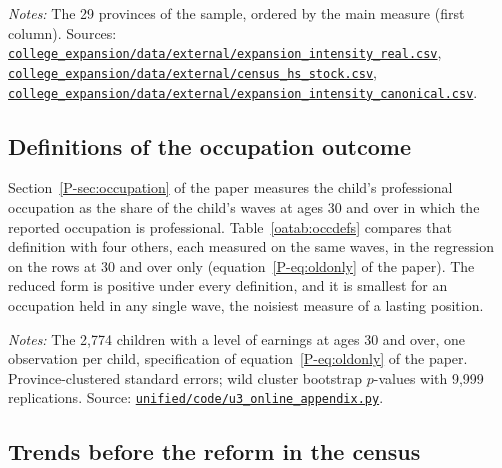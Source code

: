 \documentclass[11pt]{article}
\numberwithin{equation}{section}
\newcommand{\repourl}{https://github.com/JiachenJin1001/family-background-earnings-china}
\newcommand{\code}[1]{\href{\repourl/blob/main/#1}{\nolinkurl{#1}}}
\begin{document}
\begin{table}[H]
\centering
\footnotesize
\caption{Provincial intensity measures.}
\label{oatab:intensity}
\setlength{\tabcolsep}{3.4pt}

\par\smallskip
\begin{minipage}{0.96\textwidth}
\footnotesize\emph{Notes:} The 29 provinces of the sample,
ordered by the main measure (first column). Sources:
\code{college_expansion/data/external/expansion_intensity_real.csv},
\code{college_expansion/data/external/census_hs_stock.csv},
\code{college_expansion/data/external/expansion_intensity_canonical.csv}.
\end{minipage}
\end{table}

\subsection{Definitions of the occupation outcome}

Section~\ref{P-sec:occupation} of the paper measures the child's
professional occupation as the share of the child's waves at ages 30
and over in which the reported occupation is professional.
Table~\ref{oatab:occdefs} compares that definition with four others,
each measured on the same waves, in the regression on the rows at 30
and over only (equation~\eqref{P-eq:oldonly} of the paper). The reduced
form is positive under every definition, and it is smallest for an
occupation held in any single wave, the noisiest measure of a lasting
position.

\begin{table}[H]
\centering
\small
\caption{The occupation reduced form under five definitions of the
outcome.}
\label{oatab:occdefs}

\par\smallskip
\begin{minipage}{0.92\textwidth}
\footnotesize\emph{Notes:} The 2,774 children with a level of earnings at ages 30 and over, one observation per child,
specification of equation~\eqref{P-eq:oldonly} of the paper. Province-clustered standard errors;
wild cluster bootstrap $p$-values with 9,999 replications. Source:
\code{unified/code/u3_online_appendix.py}.
\end{minipage}
\end{table}

\subsection{Trends before the reform in the census}
\end{document}
